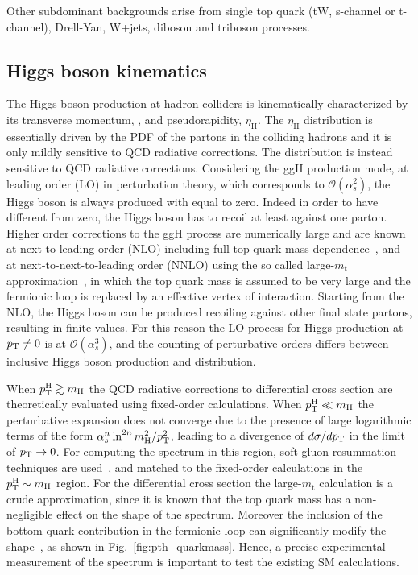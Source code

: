 Other subdominant backgrounds arise from single top quark (tW, s-channel or t-channel), Drell-Yan, W+jets, diboson and triboson processes.


\subsection{Higgs boson kinematics}

The Higgs boson production at hadron colliders is kinematically characterized by its transverse momentum, \pth, and pseudorapidity, $\eta_\mathrm{H}$. The $\eta_\mathrm{H}$ distribution is essentially driven by the PDF of the partons in the colliding hadrons and it is only mildly sensitive to QCD radiative corrections. The \pth distribution is instead sensitive to QCD radiative corrections. 
Considering the ggH production mode, at leading order (LO) in perturbation theory, which corresponds to $\mathcal{O}(\alpha_s^2)$, the Higgs boson is always produced with \pth equal to zero. Indeed in order to have \pt different from zero, the Higgs boson has to recoil at least against one parton. Higher order corrections to the ggH process are numerically large and are known at next-to-leading order (NLO) including full top quark mass dependence~\cite{Spira:1995rr,Harlander:2005rq}, and at next-to-next-to-leading order (NNLO) using the so called large-$m_\mathrm{t}$ approximation~\cite{Ravindran:2003um,Catani:2007vq,Anastasiou:2015ema}, in which the top quark mass is assumed to be very large and the fermionic loop is replaced by an effective vertex of interaction. Starting from the NLO, the Higgs boson can be produced recoiling against other final state partons, resulting in finite \pth values. For this reason the LO process for Higgs production at $p_\mathrm{T} \neq 0$ is at $\mathcal{O}(\alpha_s^3)$, and the counting of perturbative orders differs between inclusive Higgs boson production and \pth distribution. 

When $p_\mathrm{T}^\mathrm{H} \gtrsim m_\mathrm{H}$ the QCD radiative corrections to \pth differential cross section are theoretically evaluated using fixed-order calculations. When $p_\mathrm{T}^\mathrm{H} \ll m_\mathrm{H}$ the perturbative expansion does not converge due to the presence of large logarithmic terms of the form $\alpha_s^n \ln^{2n}m_\mathrm{H}^2/p_\mathrm{T}^2$, leading to a divergence of $d\sigma/dp_\mathrm{T}$ in the limit of $p_\mathrm{T}\to0$. For computing the \pth spectrum in this region, soft-gluon resummation techniques are used~\cite{Bozzi:2005wk,deFlorian:2012mx}, and matched to the fixed-order calculations in the $p_\mathrm{T}^\mathrm{H} \sim m_\mathrm{H}$ region.
For the \pth differential cross section the large-$m_\mathrm{t}$ calculation is a crude approximation, since it is known that the top quark mass has a non-negligible effect on the shape of the spectrum. Moreover the inclusion of the bottom quark contribution in the fermionic loop can significantly modify the \pth shape~\cite{Grazzini:2013mca}, as shown in Fig.~\ref{fig:pth_quarkmass}. Hence, a precise experimental measurement of the \pth spectrum is important to test the existing SM calculations. 

